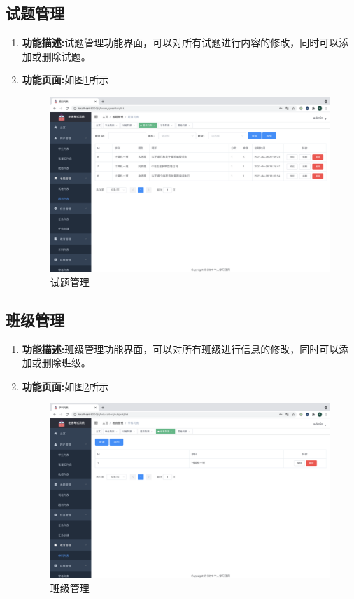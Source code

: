 \subsection{试题管理}
\begin{enumerate}
	\item[] \textbf{功能描述:}试题管理功能界面，可以对所有试题进行内容的修改，同时可以添加或删除试题。
	\item[] \textbf{功能页面:}如图\ref{figure:timu}所示 \\
		\begin{figure}[H]
			\centering
			\includegraphics[width=1.0\textwidth,keepaspectratio]{data/chapter-5/timu.png}
			\caption{试题管理}
			\label{figure:timu}
		\end{figure}
\end{enumerate}

\subsection{班级管理}
\begin{enumerate}
	\item[] \textbf{功能描述:}班级管理功能界面，可以对所有班级进行信息的修改，同时可以添加或删除班级。
	\item[] \textbf{功能页面:}如图\ref{figure:xueke}所示 \\
		\begin{figure}[H]
			\centering
			\includegraphics[width=1.0\textwidth,keepaspectratio]{data/chapter-5/xueke.png}
			\caption{班级管理}
			\label{figure:xueke}
		\end{figure}
\end{enumerate}

